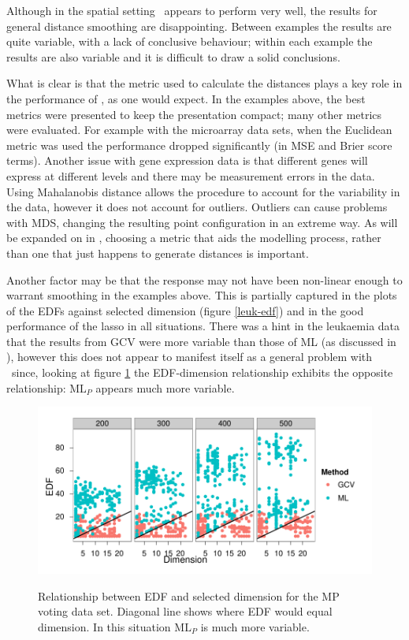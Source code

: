 Although in the spatial setting \mdsds\ appears to perform very well, the results for general distance smoothing are disappointing. Between examples the results are quite variable, with a lack of conclusive behaviour; within each example the results are also variable and it is difficult to draw a solid conclusions. 

What is clear is that the metric used to calculate the distances plays a key role in the performance of \mdsds, as one would expect. In the examples above, the best metrics were presented to keep the presentation compact; many other metrics were evaluated. For example with the microarray data sets, when the Euclidean metric was used the performance dropped significantly (in MSE and Brier score terms). Another issue with gene expression data is that different genes will express at different levels and there may be measurement errors in the data. Using Mahalanobis distance allows the procedure to account for the variability in the data, however it does not account for outliers. Outliers can cause problems with MDS, changing the resulting point configuration in an extreme way. As will be expanded on in , choosing a metric that aids the modelling process, rather than one that just happens to generate distances is important.

Another factor may be that the response may not have been non-linear enough to warrant smoothing in the examples above. This is partially captured in the plots of the EDFs against selected dimension (figure \ref{leuk-edf}) and in the good performance of the lasso in all situations. There was a hint in the leukaemia data that the results from GCV were more variable than those of ML (as discussed in ), however this does not appear to manifest itself as a general problem with \mdsds\ since, looking at figure \ref{mps-edf-dim} the EDF-dimension relationship exhibits the opposite relationship: $\text{ML}_P$ appears much more variable.

\begin{figure}
\centering
\includegraphics[width=\textwidth]{gds/figs/mps-dim-edf.pdf} \\
\caption{Relationship between EDF and selected dimension for the MP voting data set. Diagonal line shows where EDF would equal dimension. In this situation $\text{ML}_P$ is much more variable.}
\label{mps-edf-dim}
\end{figure}

